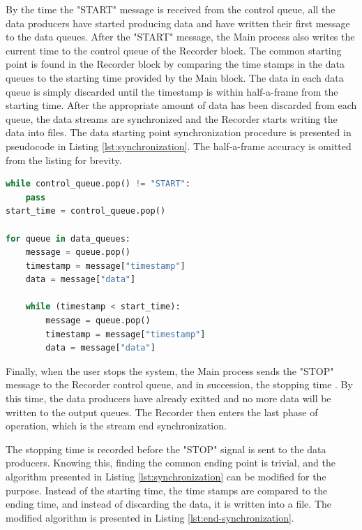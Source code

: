 By the time the "START" message is received from the control queue,
all the data producers have started producing data and have written their first message to the data queues.
After the "START" message, the Main process also writes the current time to the control queue of the Recorder block.
The common starting point is found in the Recorder block by comparing the time stamps in the data queues to the starting time provided by the Main block.
The data in each data queue is simply discarded until the timestamp is within half-a-frame from the starting time.
After the appropriate amount of data has been discarded from each queue,
the data streams are synchronized and the Recorder starts writing the data into files.
The data starting point synchronization procedure is presented in pseudocode in Listing \ref{lst:synchronization}.
The half-a-frame accuracy is omitted from the listing for brevity.

\begin{lstlisting}[language=Python, caption={Start of data synchronization pseudocode.},label={lst:synchronization}]
while control_queue.pop() != "START":
    pass
start_time = control_queue.pop()

for queue in data_queues:
    message = queue.pop()
    timestamp = message["timestamp"]
    data = message["data"]
    
    while (timestamp < start_time):
        message = queue.pop()
        timestamp = message["timestamp"]
        data = message["data"]
\end{lstlisting}

Finally, when the user stops the system, the Main process sends the "STOP" message to the Recorder control queue,
and in succession, the stopping time .
By this time, the data producers have already exitted and no more data will be written to the output queues.
The Recorder then enters the last phase of operation,
which is the stream end synchronization.

The stopping time is recorded before the "STOP" signal is sent to the data producers.
Knowing this, finding the common ending point is trivial,
and the algorithm presented in Listing \ref{lst:synchronization} can be modified for the purpose.
Instead of the starting time, the time stamps are compared to the ending time,
and instead of discarding the data, it is written into a file.
The modified algorithm is presented in Listing \ref{lst:end-synchronization}.

